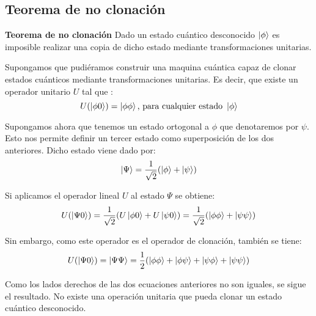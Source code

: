 \subsection{Teorema de no clonación}

\begin{thm} \textbf{Teorema de no clonación}
Dado un estado cuántico desconocido $\left|\phi\right\rangle$ es imposible realizar una copia de dicho estado mediante transformaciones unitarias.
\end{thm}

Supongamos que pudiéramos construir una maquina cuántica capaz de clonar estados cuánticos mediante transformaciones unitarias. Es decir, que existe un operador unitario $U$  tal que :
\begin{equation}
U(\left|\phi 0\right\rangle) = \left|\phi\phi\right\rangle \textrm{, para cualquier estado } \left|\phi\right\rangle 
\end{equation}

Supongamos ahora que tenemos un estado ortogonal a $\phi$ que denotaremos por $\psi$. Esto nos permite definir un tercer estado como superposición de los dos anteriores. Dicho estado viene dado por:
\begin{equation}
\left|\Psi\right\rangle = \dfrac{1}{\sqrt{2}}(\left|\phi\right\rangle + \left|\psi\right\rangle)
\end{equation}

Si aplicamos el operador lineal $U$ al estado $\Psi$ se obtiene:
\begin{equation}
U(\left|\Psi 0\right\rangle)= \dfrac{1}{\sqrt{2}}(U\left|\phi 0\right\rangle + U\left|\psi 0\right\rangle) = \dfrac{1}{\sqrt{2}}(\left|\phi\phi\right\rangle + \left|\psi\psi\right\rangle)
\end{equation}

Sin embargo, como este operador es el operador de clonación, también se tiene:
\begin{equation}
U(\left|\Psi 0\right\rangle)= \left|\Psi\Psi\right\rangle = \dfrac{1}{2}(\left|\phi\phi\right\rangle + \left|\phi\psi\right\rangle + \left|\psi\phi\right\rangle + \left|\psi\psi\right\rangle)
\end{equation}

Como los lados derechos de las dos ecuaciones anteriores no son iguales, se sigue el resultado. No existe una operación unitaria que pueda clonar un estado cuántico desconocido.